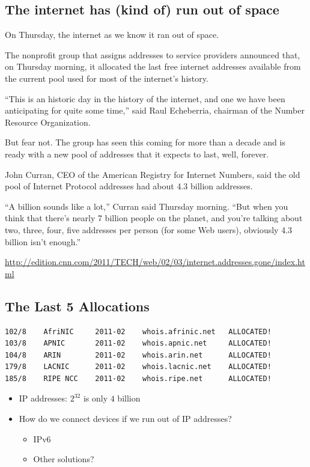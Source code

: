 \subsection{The internet has (kind of) run out of space}
\begin{tcolorbox}[colframe=red!40!white,colback=yellow!20,title=The internet has (kind of) run out of space]
    On Thursday, the internet as we know it ran out of space.

    The nonprofit group that assigns addresses to service providers announced that, on Thursday morning, it allocated the last free internet addresses available from the current pool used for most of the internet's history.

    ``This is an historic day in the history of the internet, and one we have been anticipating for quite some time,'' said Raul Echeberria, chairman of the Number Resource Organization.

    But fear not. The group has seen this coming for more than a decade and is ready with a new pool of addresses that it expects to last, well, forever.

    John Curran, CEO of the American Registry for Internet Numbers, said the old pool of Internet Protocol addresses had about 4.3 billion addresses.

    ``A billion sounds like a lot,'' Curran said Thursday morning. ``But when you think that there's nearly 7 billion people on the planet, and you're talking about two, three, four, five addresses per person (for some Web users), obviously 4.3 billion isn't enough.''

    \url{http://edition.cnn.com/2011/TECH/web/02/03/internet.addresses.gone/index.html}
\end{tcolorbox}

\subsection{The Last 5 Allocations}
\begin{verbatim}
102/8    AfriNIC     2011-02    whois.afrinic.net   ALLOCATED!
103/8    APNIC       2011-02    whois.apnic.net     ALLOCATED!
104/8    ARIN        2011-02    whois.arin.net      ALLOCATED!
179/8    LACNIC      2011-02    whois.lacnic.net    ALLOCATED!
185/8    RIPE NCC    2011-02    whois.ripe.net      ALLOCATED!
\end{verbatim}
\begin{itemize}[nosep]
    \item IP addresses: $2^32$ is only $4$ billion
    \item How do we connect devices if we run out of IP addresses?
          \begin{itemize}[nosep]
              \item IPv6
              \item Other solutions?
          \end{itemize}
\end{itemize}

